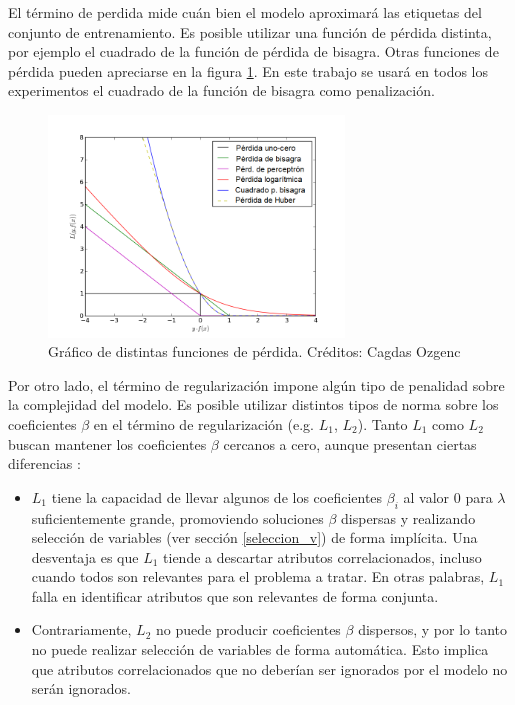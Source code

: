 El término de perdida mide cuán bien el modelo aproximará las etiquetas del conjunto de entrenamiento. Es posible utilizar una función de pérdida distinta, por ejemplo el cuadrado de la función de pérdida de bisagra. Otras funciones de pérdida pueden apreciarse en la figura \ref{fig:loss_func}. En este trabajo se usará en todos los experimentos el cuadrado de la función de bisagra como penalización. \\


\begin{figure}[h!]
\begin{center}
  \includegraphics[width=0.7\textwidth]{Kap1/loss_func.png} 
  \end{center}
 \caption{ Gráfico de distintas funciones de pérdida. Créditos: Cagdas Ozgenc }
\label{fig:loss_func}
\end{figure}

Por otro lado, el término de regularización impone algún tipo de penalidad sobre la complejidad del modelo. Es posible utilizar distintos tipos de norma sobre los coeficientes $\beta$ en el término de regularización (e.g. $L_1$, $L_2$). Tanto $L_1$ como $L_2$ buscan mantener los coeficientes $\beta$ cercanos a cero, aunque presentan ciertas diferencias \cite{lopezmartinez2017regularization}:

\begin{itemize}
\item $L_1$ tiene la capacidad de llevar algunos de los coeficientes $\beta_i$ al valor 0 para $\lambda$ suficientemente grande, promoviendo  soluciones $\beta$ dispersas y realizando selección de variables (ver sección \ref{seleccion_v}) de forma implícita. Una desventaja es que $L_1$ tiende a descartar atributos correlacionados, incluso cuando todos son relevantes para el problema a tratar. En otras palabras, $L_1$ falla en identificar atributos que son relevantes de forma conjunta.
\item Contrariamente, $L_2$ no puede producir coeficientes $\beta$ dispersos, y por lo tanto no puede realizar selección de variables de forma automática. Esto implica que atributos correlacionados que no deberían ser ignorados por el modelo no serán ignorados.
\end{itemize}

